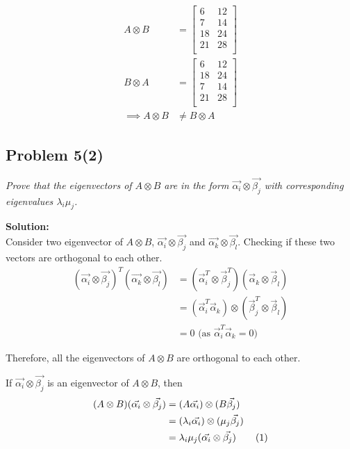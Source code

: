 \documentclass[12pt,a4paper]{article}
\newcommand\numberthis{\addtocounter{equation}{1}\tag{\theequation}}
\newcommand{\solution}{\noindent\textbf{Solution:}\\\indent}
\begin{document}
\begin{align}
    A\otimes B &= \begin{bmatrix}
        6 & 12 \\
        7 & 14 \\
        18 & 24 \\
        21 & 28 \\
    \end{bmatrix} \\
    B\otimes A &= \begin{bmatrix}
        6 & 12 \\
        18 & 24 \\
        7 & 14 \\
        21 & 28 \\
    \end{bmatrix} \\
    \implies A\otimes B &\neq B\otimes A
\end{align}

\subsection*{Problem 5(2)}
\textit{
    Prove that the eigenvectors of $A\otimes B$ are in the form $\vec{\alpha_i}\otimes \vec{\beta_j}$ with corresponding eigenvalues $\lambda_i\mu_j$.
}

\solution
Consider two eigenvector of $A\otimes B$, $\vec{\alpha_i}\otimes \vec{\beta_j}$ and $\vec{\alpha_k}\otimes \vec{\beta_l}$. Checking if these two vectors are orthogonal to each other.
\begin{align*}
    (\vec{\alpha_i}\otimes \vec{\beta_j})^T(\vec{\alpha_k}\otimes \vec{\beta_l}) &= (\vec{\alpha}_i^T\otimes \vec{\beta}_j^T)(\vec{\alpha}_k\otimes \vec{\beta}_l) \\
    &= (\vec{\alpha}_i^T\vec{\alpha}_k)\otimes (\vec{\beta}_j^T\otimes \vec{\beta}_l) \\
    &= 0 \text{ (as $\vec{\alpha}_i^T\vec{\alpha}_k = 0$)}
\end{align*}

Therefore, all the eigenvectors of $A\otimes B$ are orthogonal to each other.

If $\vec{\alpha_i}\otimes \vec{\beta_j}$ is an eigenvector of $A\otimes B$, then
\begin{align*}
    (A\otimes B)(\vec{\alpha_i}\otimes \vec{\beta_j}) &= (A\vec{\alpha_i})\otimes (B\vec{\beta_j}) \\
    &= (\lambda_i\vec{\alpha_i}) \otimes (\mu_j\vec{\beta_j}) \\
    &= \lambda_i\mu_j(\vec{\alpha_i}\otimes \vec{\beta_j}) \numberthis
\end{align*}
\end{document}
